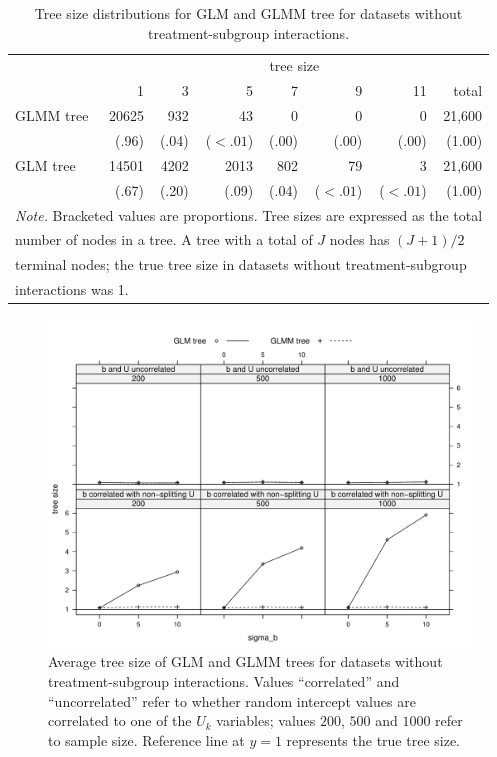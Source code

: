 \documentclass[nobf,doc]{apa}
\begin{document}
\begin{table}[!htbp]
\caption{Tree size distributions for GLM and GLMM tree for datasets without treatment-subgroup interactions.}
\small
\begin{tabular}{lrrrrrrr}
	\thickline
	&\multicolumn{7}{c}{tree size}\\
	\cline{2-7}
	&   1    &   3   &   5   &   7   &   9   &  11  &   total \\
	\hline
	GLMM tree	& 20625 & 932 & 43 &0&0&0& 21,600\\
		  		& (.96) & (.04) & ($<.01$) &(.00)&(.00)&(.00)&(1.00) \\
   	GLM tree		& 14501  & 4202 & 2013 & 802 & 79 & 3 & 21,600 \\ 
    			& (.67)  & (.20) & (.09) & (.04) & ($<.01$) & ($<.01$) & (1.00)\\ 
	\hline
  	\multicolumn{8}{l}{\textit{Note. }Bracketed values are proportions. Tree sizes are expressed as the total}\\
  	\multicolumn{8}{l}{number of nodes in a tree. A tree with a total of $J$ nodes has $(J+1)/2$ }\\
  	\multicolumn{8}{l}{terminal nodes; the true tree size in datasets without treatment-subgroup}\\	  	\multicolumn{8}{l}{interactions was 1.}\\
\end{tabular}
\label{tab:treesize_main}
\end{table}


\begin{figure}[!htbp]
	\includegraphics[width=12cm]{xy_treesizes_maineff.pdf}
	\caption{Average tree size of GLM and GLMM trees for datasets without treatment-subgroup interactions. Values ``correlated'' and ``uncorrelated'' refer to whether random intercept values are correlated to one of the $U_k$ variables; values $200$, $500$ and $1000$ refer to sample size. Reference line at $y=1$ represents the true tree size.}
	\label{fig:xyplot_treesize_nointeract}
\end{figure}
\end{document}
